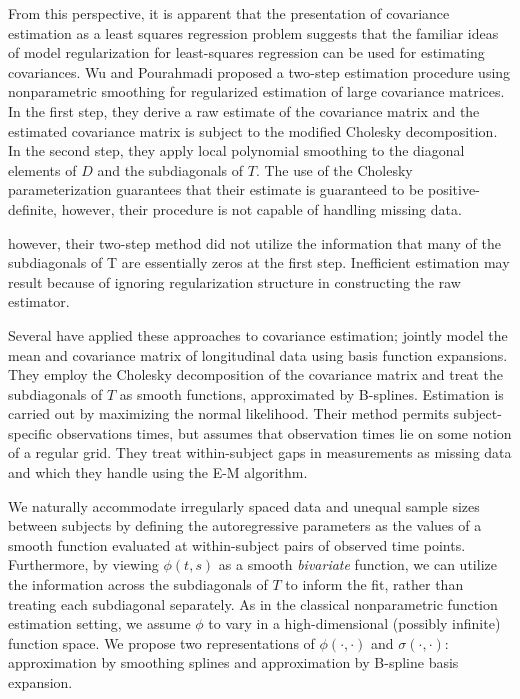 \documentclass[12pt]{article}
\theoremstyle{definition}
\begin{document}
\bigskip

From this perspective, it is apparent that the presentation of covariance estimation as a least squares regression problem suggests that the familiar ideas of model regularization for least-squares regression can be used for estimating covariances.  Wu and Pourahmadi \citet{wu2003nonparametric} proposed a two-step estimation procedure using nonparametric smoothing for regularized estimation of large covariance matrices.  In the first step, they derive a raw estimate of the covariance matrix and the estimated covariance matrix is subject to the modified Cholesky decomposition. In the second step, they apply local polynomial smoothing to the diagonal elements of $D$ and the subdiagonals of $T$. The use of the Cholesky parameterization guarantees that their estimate is guaranteed to be positive-definite, however, their procedure is not capable of handling missing data. \citet{huang2007estimation} 

however, their two-step method did not utilize the information that many of the subdiagonals of T are essentially zeros at the first step. Inefficient estimation may result because of ignoring regularization structure in constructing the raw estimator. 

Several have applied these approaches to covariance estimation; \citet{huang2007estimation} jointly model the mean and covariance matrix of longitudinal data using basis function expansions. They employ the Cholesky decomposition of the covariance matrix and treat the subdiagonals of $T$ as smooth functions, approximated by B-splines. Estimation is carried out by maximizing the normal likelihood. Their method permits subject-specific observations times, but assumes that observation times lie on some notion of a regular grid. They treat within-subject gaps in measurements as missing data and which they handle using the E-M algorithm. 

\bigskip

We naturally accommodate irregularly spaced data and unequal sample sizes between subjects by defining the autoregressive parameters as the values of a smooth function evaluated at within-subject pairs of observed time points.  Furthermore, by viewing $\phi\left(t,s\right)$ as a smooth \emph{bivariate} function, we can utilize the information across the subdiagonals of $T$ to inform the fit, rather than treating each subdiagonal separately.  As in the classical nonparametric function estimation setting, we assume $\phi$ to vary in a high-dimensional (possibly infinite) function space. We propose two representations of $\phi\left(\cdot, \cdot\right)$ and $\sigma\left(\cdot, \cdot\right)$: approximation by smoothing splines and approximation by B-spline basis expansion. 
\end{document}
